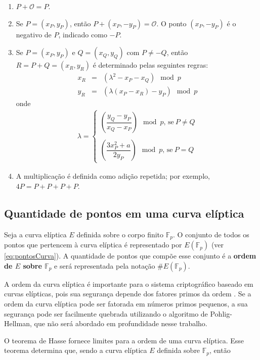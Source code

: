 \begin{enumerate}
  \item $P + \mathcal{O} = P$.
  \item Se $P = (x_P, y_P)$, então $P + (x_P, -y_P) = \mathcal{O}$. O ponto $(x_P, -y_P)$ é o negativo de \(P\), indicado como \(-P\).
  \item Se $P = (x_P, y_P)$ e $Q = (x_Q, y_Q)$ com $P \neq -Q$, então $R = P + Q = (x_R, y_R)$ é determinado pelas seguintes regras:
    \begin{eqnarray*}
    x_R &=& (\lambda^2 - x_P - x_Q) \mod p \\
    y_R &=& (\lambda(x_P - x_R) - y_P) \mod p
    \end{eqnarray*}
  onde
    \begin{eqnarray*}
    \lambda =
    \begin{cases}
    \left(\dfrac{y_Q - y_P}{x_Q - x_P}\right) \mod p \textrm{, se} \ P \neq Q \\ \\
    \left(\dfrac{3x_P^2 + a}{2y_P}\right) \mod p \textrm{, se} \ P = Q
    \end{cases}
    \end{eqnarray*}
  \item A multiplicação é definida como adição repetida; por exemplo, $4P = P + P + P + P$.
\end{enumerate}

%
%
\subsection{Quantidade de pontos em uma curva elíptica}
Seja a curva elíptica $E$ definida sobre o corpo finito $\mathbb{F}_p$. O conjunto de todos os pontos que pertencem à curva elíptica é representado por $E(\mathbb{F}_p)$ (ver \ref{eq:pontosCurva}). A quantidade de pontos que compõe esse conjunto é a \textbf{ordem de $E$ sobre $\mathbb{F}_p$} e será representada pela notação $\#E(\mathbb{F}_p)$. \cite{Guide}

A ordem da curva elíptica é importante para o sistema criptográfico baseado em curvas elípticas, pois sua segurança depende dos fatores primos da ordem \cite{Alvarado:2005}. Se a ordem da curva elíptica pode ser fatorada em números primos pequenos, a sua segurança pode ser facilmente quebrada utilizando o algoritmo de Pohlig-Hellman, que não será abordado em profundidade nesse trabalho.

O teorema de Hasse fornece limites para a ordem de uma curva elíptica. Esse teorema determina que, sendo a curva elíptica $E$ definida sobre $\mathbb{F}_p$, então

